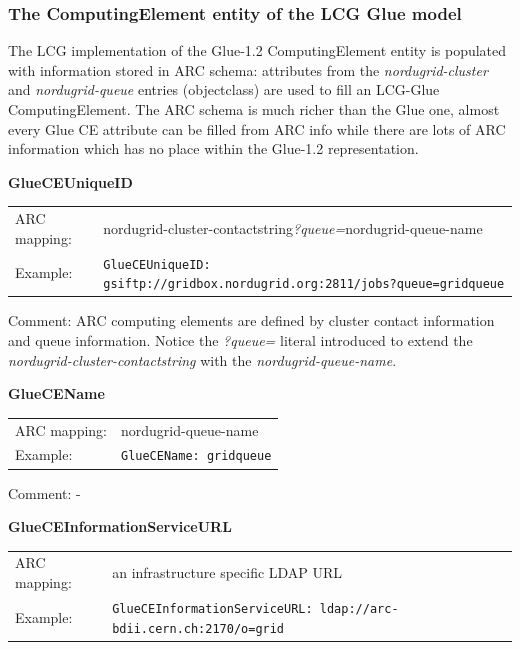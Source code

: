 \documentclass{article}
\begin{document}
 
\subsubsection{The ComputingElement entity of the LCG Glue model}

The LCG implementation of the Glue-1.2 ComputingElement entity is
populated with information stored in ARC schema: 
attributes from the {\it nordugrid-cluster} and {\it nordugrid-queue} 
entries (objectclass) are used to fill an LCG-Glue ComputingElement.
The ARC schema is much richer than the Glue one, almost every Glue CE attribute
can be filled from ARC info while there are lots of ARC information
which has no place within the Glue-1.2 representation.


\hspace*{0.5cm}
\begin{shaded}
 \textbf{GlueCEUniqueID} 
\end{shaded}
\begin{tabular}{lp{10cm}}  
  ARC mapping:&
    nordugrid-cluster-contactstring{\it ?queue=}nordugrid-queue-name\\
  Example:& \verb#GlueCEUniqueID: gsiftp://gridbox.nordugrid.org:2811/jobs?queue=gridqueue#\\
\end{tabular}

Comment: ARC computing elements are defined by cluster contact information
and queue information. Notice the {\it ?queue=} literal  introduced to
extend the {\it nordugrid-cluster-contactstring} with the
{\it nordugrid-queue-name}.


\hspace*{0.5cm}
\begin{shaded}
 \textbf{GlueCEName} 
\end{shaded}
\begin{tabular}{lp{10cm}}  
  ARC mapping:& nordugrid-queue-name\\
  Example:& \verb#GlueCEName: gridqueue#\\
\end{tabular}

Comment:  -


\hspace*{0.5cm}
\begin{shaded}
 \textbf{GlueCEInformationServiceURL} 
\end{shaded}
\begin{tabular}{lp{10cm}}  
  ARC mapping:& an infrastructure specific LDAP URL\\
  Example:& \verb#GlueCEInformationServiceURL: ldap://arc-bdii.cern.ch:2170/o=grid#\\
\end{tabular}
\end{document}
